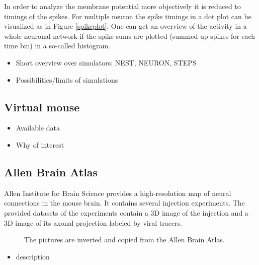 \documentclass[a4paper]{article}
\begin{document}
  In order to analyze the membrane potential more objectively it is reduced to timings of the spikes.
  For multiple neuron the spike timings in a dot plot can be visualized as in Figure \ref{spikeplot}.
  One can get an overview of the activity in a whole neuronal network if the spike sums are
  plotted (summed up spikes for each time bin) in a so-called histogram.

	\begin{itemize}
      \item Short overview over simulators: NEST, NEURON, STEPS
      \item Possibilities/limits of simulations
   \end{itemize}
   
\subsection{Virtual mouse}
	\begin{itemize}
      \item Available data
      \item Why of interest
   	\end{itemize}   
\newpage
\subsection{Allen Brain Atlas}
   Allen Institute for Brain Science provides a high-resolution map of neural connections in the mouse brain.
   It contains several injection experiments. The provided datasets of the experiments 
   contain a 3D image of the injection and a 3D image of its axonal projection labeled by viral
   tracers.
   
   \begin{figure}[ht!]
   	\begin{center}
        \hspace{1cm}
    	   \end{center}
    	\caption{%
        The pictures are inverted and copied from the Allen Brain Atlas.
     }%
   \label{fig:atlas}
   \end{figure}
   
   \begin{itemize}
      \item description
\end{itemize}
   
\end{document}
